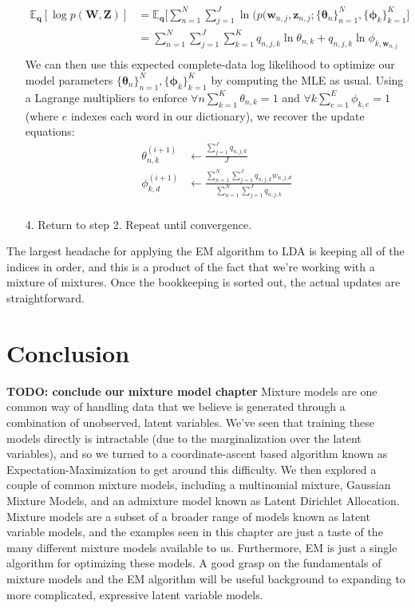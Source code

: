 \begin{itemize}
        \begin{align*}
            \mathbb{E}_{\textbf{q}}[\log p(\textbf{W}, \textbf{Z})] &= \mathbb{E}_{\textbf{q}} \bigg[ \sum_{n=1}^{N} \sum_{j=1}^{J} \ln(p(\textbf{w}_{n, j}, \textbf{z}_{n, j}; \{\boldsymbol{\theta}_n \}_{n=1}^{N}, \{ \boldsymbol{\phi}_k\}_{k=1}^{K} \bigg] \\
            &= \sum_{n=1}^{N} \sum_{j=1}^{J} \sum_{k=1}^{K} q_{n, j, k} \ln \theta_{n, k} + q_{n, j, k} \ln \phi_{k, \textbf{w}_{n, j}} \\
        \end{align*}
        We can then use this expected complete-data log likelihood to optimize our model parameters $\{\boldsymbol{\theta}_n \}_{n=1}^{N}, \{ \boldsymbol{\phi}_k\}_{k=1}^{K}$ by computing the MLE as usual. Using a Lagrange multipliers to enforce $\forall n \sum_{k=1}^{K} \theta_{n, k} = 1$ and $\forall k \sum_{e=1}^{E} \phi_{k, e} = 1$ (where $e$ indexes each word in our dictionary), we recover the update equations:
        \begin{align*}
            \theta_{n, k}^{(i + 1)} &\leftarrow \frac{\sum_{j=1}^{J} q_{n, j, k}}{J} \\
            \phi_{k, d}^{(i + 1)} &\leftarrow \frac{\sum_{n=1}^{N} \sum_{j=1}^{J} q_{n, j, k} w_{n, j, d}}{\sum_{n=1}^{N} \sum_{j=1}^{J} q_{n, j, k}} \\
        \end{align*}
    \item[4.] Return to step 2. Repeat until convergence.
\end{itemize}

The largest headache for applying the EM algorithm to LDA is keeping all of the indices in order, and this is a product of the fact that we're working with a mixture of mixtures. Once the bookkeeping is sorted out, the actual updates are straightforward.

\section{Conclusion}
\textbf{TODO: conclude our mixture model chapter}
Mixture models are one common way of handling data that we believe is generated through a combination of unobserved, latent variables. We've seen that training these models directly is intractable (due to the marginalization over the latent variables), and so we turned to a coordinate-ascent based algorithm known as Expectation-Maximization to get around this difficulty. We then explored a couple of common mixture models, including a multinomial mixture, Gaussian Mixture Models, and an admixture model known as Latent Dirichlet Allocation. Mixture models are a subset of a broader range of models known as latent variable models, and the examples seen in this chapter are just a taste of the many different mixture models available to us. Furthermore, EM is just a single algorithm for optimizing these models. A good grasp on the fundamentals of mixture models and the EM algorithm will be useful background to expanding to more complicated, expressive latent variable models.
